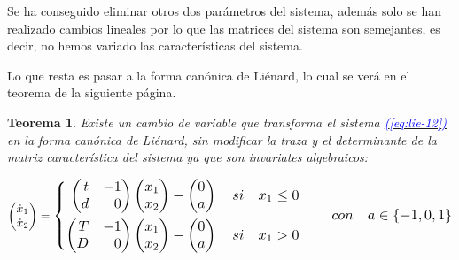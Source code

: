 \documentclass[12pt,a4paper]{report} %
\newtheorem{theorem}{Teorema}[chapter]
\newcommand{\eref}[1]{\hyperref[#1]{\textcolor{blue}{\textit{(\ref*{#1})}}}}
\begin{document}
	\vspace{0.5cm}\noindent Se ha conseguido eliminar otros dos parámetros del sistema, además solo se han realizado cambios lineales por lo que las matrices del sistema son semejantes, es decir, no hemos variado las características del sistema.
	
	\vspace{0.5cm}\noindent Lo que resta es pasar a la forma canónica de Liénard, lo cual se verá en el teorema de la siguiente página.
	
	\newpage
	
	\begin{theorem}\label{t2}
		Existe un cambio de variable que transforma el sistema \eref{eq:lie-12} en la forma canónica de Liénard, sin modificar la traza y el determinante de la matriz característica del sistema ya que son invariates algebraicos:
	\end{theorem}
	
	\begin{equation}
		\begin{pmatrix*}[r]
			\dot{x}_1 \\ \dot{x}_2
		\end{pmatrix*}=
		\label{eq:lienard}
		\scalebox{1.2}{$\displaystyle
			\left\{
			\begin{aligned}
				\begin{pmatrix*}[r]
					t & -1\\
					d & 0
				\end{pmatrix*}\begin{pmatrix*}[r]
				x_1\\x_2
				\end{pmatrix*}-\begin{pmatrix}
				0\\a
				\end{pmatrix} \quad si \quad x_1\leq 0 \\
				\begin{pmatrix*}[r]
					T & -1\\
					D & 0
				\end{pmatrix*}\begin{pmatrix*}[r]
				x_1\\x_2
				\end{pmatrix*}-\begin{pmatrix}
					0\\a
				\end{pmatrix} \quad si \quad x_1 > 0
			\end{aligned}
			\right. \qquad con\quad a \in \left\{-1,0,1\right\}
			$}
	\end{equation}\smallskip
\end{document}
